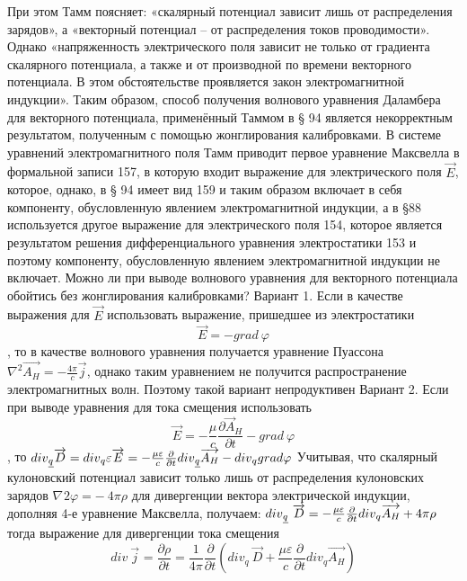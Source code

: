 \documentclass[11pt]{article}
\begin{document}
При этом Тамм поясняет: «скалярный потенциал зависит лишь от
распределения зарядов», а «векторный потенциал -- от распределения токов
проводимости». Однако «напряженность электрического поля зависит не
только от градиента скалярного потенциала, а также и от производной по
времени векторного потенциала. В этом обстоятельстве проявляется закон
электромагнитной индукции». Таким образом, способ получения волнового
уравнения Даламбера для векторного потенциала, применённый Таммом в § 94
является некорректным результатом, полученным с помощью жонглирования
калибровками. В системе уравнений электромагнитного поля Тамм приводит
первое уравнение Максвелла в формальной записи 157, в которую входит
выражение для электрического поля \(\overrightarrow{E}\), которое,
однако, в § 94 имеет вид 159 и таким образом включает в себя компоненту,
обусловленную явлением электромагнитной индукции, а в §88 используется
другое выражение для электрического поля 154, которое является
результатом решения дифференциального уравнения электростатики 153 и
поэтому компоненту, обусловленную явлением электромагнитной индукции не
включает. Можно ли при выводе волнового уравнения для векторного
потенциала обойтись без жонглирования калибровками? Вариант 1. Если в
качестве выражения для \(\overrightarrow{E}\) использовать выражение,
пришедшее из электростатики \[\overrightarrow{E}=-grad\ \varphi \], то в
качестве волнового уравнения получается уравнение Пуассона
\({{\nabla }^{2}}\overrightarrow{{{A}_{H}}}=-\frac{4\pi }{c}\overrightarrow{j}\),
однако таким уравнением не получится распространение электромагнитных
волн. Поэтому такой вариант непродуктивен Вариант 2. Если при выводе
уравнения для тока смещения использовать
\[\overrightarrow{E}=-\frac{\mu }{c}\frac{\partial {{\overrightarrow{A}}_{H}}}{\partial t}-grad\ \varphi \],
то
${{div}_{\emph{q}}\overrightarrow{D}={{div}}_{q}} \varepsilon \overrightarrow{E}=-\frac{\mu \varepsilon }{c}\frac{\partial }{\partial t}{{div}_{\emph{q}}\overrightarrow{{{A}_{H}}}-{{div}}_{q}} grad \varphi$
Учитывая, что скалярный кулоновский потенциал зависит только лишь от
распределения кулоновских зарядов
${{\nabla }^{}{2}}\varphi =-~4\pi \rho$ для дивергенции
вектора электрической индукции, дополняя 4-е уравнение Максвелла,
получаем:
${{div}_{\emph{q}}~\overrightarrow{D}=-\frac{\mu \varepsilon }{c}\frac{\partial }{\partial t}{{div}}_{q}}\overrightarrow{{{A}_{H}}}+4\pi \rho$
тогда выражение для дивергенции тока смещения
\[div\ {{\overrightarrow{j}}_{}}=\frac{\partial \rho }{\partial t}=\frac{1}{4\pi }\frac{\partial }{\partial t}\left( di{{v}_{q}}\ \overrightarrow{D}+\frac{\mu \varepsilon }{c}\frac{\partial }{\partial t}di{{v}_{q}}\overrightarrow{{{A}_{H}}} \right)\]
\end{document}
